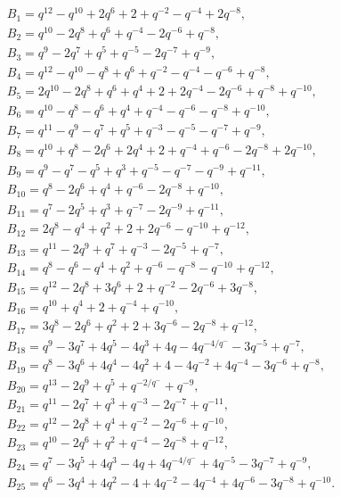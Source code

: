 \documentclass[10pt,a4paper]{amsart}
\numberwithin{equation}{section}
\theoremstyle{definition}
\begin{document}
\begin{gather*}
 B_1 = q^{12}-q^{10}+2q^{6}+2+q^{-2}-q^{-4}+2q^{-8}, \\[-1pt]
 B_2 = q^{10}-2q^{8}+q^{6}+q^{-4}-2q^{-6}+q^{-8}, \\[-1pt]
 B_3 = q^{9}-2q^{7}+q^{5}+q^{-5}-2q^{-7}+q^{-9}, \\[-1pt]
 B_4 = q^{12}-q^{10}-q^{8}+q^{6}+q^{-2}-q^{-4}-q^{-6}+q^{-8}, \\[-1pt]
 B_5 = 2q^{10}-2q^{8}+q^{6}+q^{4}+2+2q^{-4}-2q^{-6}+q^{-8}+q^{-10}, \\[-1pt]
 B_6 = q^{10}-q^{8}-q^{6}+q^{4}+q^{-4}-q^{-6}-q^{-8}+q^{-10}, \\[-1pt]
 B_7 = q^{11}-q^{9}-q^{7}+q^{5}+q^{-3}-q^{-5}-q^{-7}+q^{-9},\\[-1pt]
 B_8 = q^{10}+q^{8}-2q^{6}+2q^{4}+2+q^{-4}+q^{-6}-2q^{-8}+2q^{-10}, \\[-1pt]
 B_9 = q^{9}-q^{7}-q^{5}+q^{3}+q^{-5}-q^{-7}-q^{-9}+q^{-11}, \\[-1pt]
 B_{10} = q^{8}-2q^{6}+q^{4}+q^{-6}-2q^{-8}+q^{-10}, \\[-1pt]
 B_{11} = q^{7}-2q^{5}+q^{3}+q^{-7}-2q^{-9}+q^{-11}, \\[-1pt]
 B_{12} = 2q^{8}-q^{4}+q^{2}+2+2q^{-6}-q^{-10}+q^{-12}, \\[-1pt]
 B_{13} = q^{11}-2q^{9}+q^{7}+q^{-3}-2q^{-5}+q^{-7}, \\[-1pt]
 B_{14} = q^{8}-q^{6}-q^{4}+q^{2}+q^{-6}-q^{-8}-q^{-10}+q^{-12}, \\[-1pt]
 B_{15} = q^{12}-2q^{8}+3q^{6}+2+q^{-2}-2q^{-6}+3q^{-8},\\[-1pt]
 B_{16} = q^{10}+q^{4}+2+q^{-4}+q^{-10}, \\[-1pt]
 B_{17} = 3q^{8}-2q^{6}+q^{2}+2+3q^{-6}-2q^{-8}+q^{-12}, \\[-1pt]
 B_{18} = q^{9}-3q^{7}+4q^{5}-4q^{3}+4q-4q^{-4/q^{-}}-3q^{-5}+q^{-7}, \\[-1pt]
 B_{19} = q^{8}-3q^{6}+4q^{4}-4q^{2}+4-4q^{-2}+4q^{-4}-3q^{-6}+q^{-8}, \\[-1pt]
 B_{20} = q^{13}-2q^{9}+q^{5}+q^{-2/q^{-}}+q^{-9}, \\[-1pt]
 B_{21} = q^{11}-2q^{7}+q^{3}+q^{-3}-2q^{-7}+q^{-11}, \\[-1pt]
 B_{22} = q^{12}-2q^{8}+q^{4}+q^{-2}-2q^{-6}+q^{-10}, \\[-1pt]
 B_{23} = q^{10}-2q^{6}+q^{2}+q^{-4}-2q^{-8}+q^{-12}, \\[-1pt]
 B_{24} = q^{7}-3q^{5}+4q^{3}-4q+4q^{-4/q^{-}}+4q^{-5}-3q^{-7}+q^{-9}, \\[-1pt]
 B_{25} = q^{6}-3q^{4}+4q^{2}-4+4q^{-2}-4q^{-4}+4q^{-6}-3q^{-8}+q^{-10}.
\end{gather*}
\end{document}
